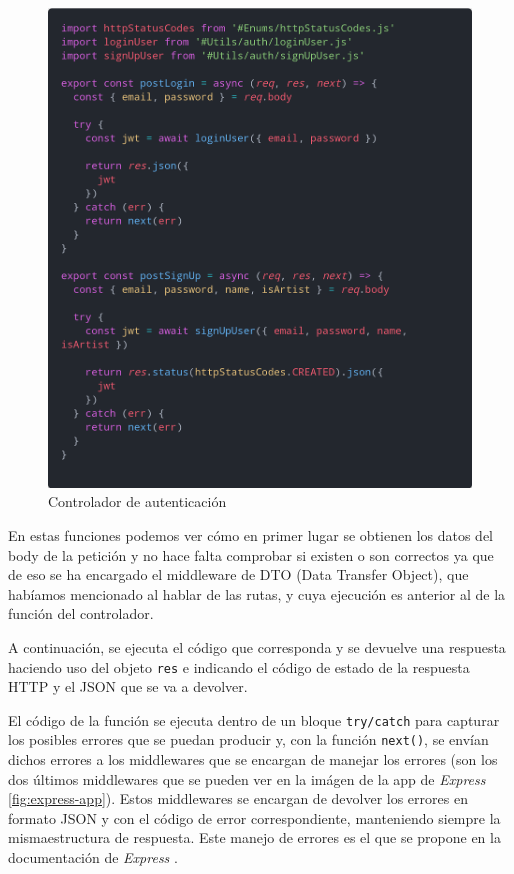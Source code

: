 \begin{figure}[H]
  \centering
  \includegraphics[width=1\textwidth]{img/auth-controller}
  \caption{Controlador de autenticación}
  \label{fig:auth-controller}
\end{figure}

En estas funciones podemos ver cómo en primer lugar se obtienen los datos del body de
la petición y no hace falta comprobar si existen o son correctos ya que de eso se ha
encargado el middleware de DTO (Data Transfer Object), que habíamos mencionado al hablar
de las rutas, y cuya ejecución es anterior al de la función del controlador.

A continuación, se ejecuta el código que corresponda y se devuelve una respuesta haciendo
uso del objeto \texttt{res} e indicando el código de estado de la respuesta HTTP y el JSON
que se va a devolver.

El código de la función se ejecuta dentro de un bloque \texttt{try/catch} para capturar
los posibles errores que se puedan producir y, con la función \texttt{next()}, se envían
dichos errores a los middlewares que se encargan de manejar los errores (son los dos últimos
middlewares que se pueden ver en la imágen de la app de \textit{Express}
\ref{fig:express-app}). Estos middlewares se encargan de devolver los errores en formato
JSON y con el código de error correspondiente, manteniendo siempre la mismaestructura de
respuesta. Este manejo de errores es el que se propone en la documentación de \textit{Express}
\cite{express-error-handling}.

